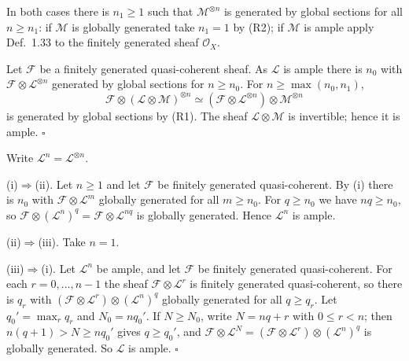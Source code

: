 \documentclass[11pt]{article}
\begin{document}
In both cases there is $n_1\ge1$ such that $\mathcal{M}^{\otimes n}$ is generated by global sections for all $n\ge n_1$: if $\mathcal{M}$ is globally generated take $n_1=1$ by (R2); if $\mathcal{M}$ is ample apply Def.~1.33 to the finitely generated sheaf $\mathcal{O}_X$.

Let $\mathcal{F}$ be a finitely generated quasi-coherent sheaf. As $\mathcal{L}$ is ample there is $n_0$ with $\mathcal{F}\otimes\mathcal{L}^{\otimes n}$ generated by global sections for $n\ge n_0$. For $n\ge\max(n_0,n_1)$,
\[ \mathcal{F}\otimes(\mathcal{L}\otimes\mathcal{M})^{\otimes n}\simeq(\mathcal{F}\otimes\mathcal{L}^{\otimes n})\otimes\mathcal{M}^{\otimes n} \]
is generated by global sections by (R1). The sheaf $\mathcal{L}\otimes\mathcal{M}$ is invertible; hence it is ample. \hfill$\square$

\pf
Write $\mathcal{L}^n=\mathcal{L}^{\otimes n}$.

(i)$\Rightarrow$(ii). Let $n\ge1$ and let $\mathcal{F}$ be finitely generated quasi-coherent. By (i) there is $n_0$ with $\mathcal{F}\otimes\mathcal{L}^m$ globally generated for all $m\ge n_0$. For $q\ge n_0$ we have $nq\ge n_0$, so $\mathcal{F}\otimes(\mathcal{L}^n)^q=\mathcal{F}\otimes\mathcal{L}^{nq}$ is globally generated. Hence $\mathcal{L}^n$ is ample.

(ii)$\Rightarrow$(iii). Take $n=1$.

(iii)$\Rightarrow$(i). Let $\mathcal{L}^n$ be ample, and let $\mathcal{F}$ be finitely generated quasi-coherent. For each $r=0,\dots,n-1$ the sheaf $\mathcal{F}\otimes\mathcal{L}^r$ is finitely generated quasi-coherent, so there is $q_r$ with $(\mathcal{F}\otimes\mathcal{L}^r)\otimes(\mathcal{L}^n)^q$ globally generated for all $q\ge q_r$. Let $q_0'=\max_rq_r$ and $N_0=nq_0'$. If $N\ge N_0$, write $N=nq+r$ with $0\le r<n$; then $n(q+1)>N\ge nq_0'$ gives $q\ge q_0'$, and $\mathcal{F}\otimes\mathcal{L}^N=(\mathcal{F}\otimes\mathcal{L}^r)\otimes(\mathcal{L}^n)^q$ is globally generated. So $\mathcal{L}$ is ample. \hfill$\square$
\end{document}
